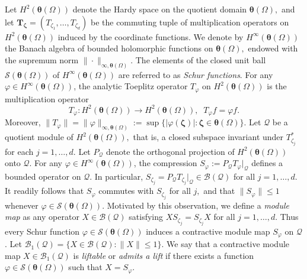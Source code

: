 \documentclass[12pt,reqno]{amsart}
\theoremstyle{remark}
\theoremstyle{definition}
\begin{document}
Let $H^2(\boldsymbol \theta(\Omega))$ denote the Hardy space on the quotient domain $\boldsymbol \theta(\Omega),$ and let $\boldsymbol T_{\boldsymbol \zeta}=(T_{\zeta_1}, \ldots, T_{\zeta_d})$ be the commuting tuple of multiplication operators on $H^2(\boldsymbol \theta(\Omega))$ induced by the coordinate functions. 
We denote by $H^\infty(\boldsymbol \theta(\Omega))$ the Banach algebra of bounded holomorphic functions on $\boldsymbol \theta(\Omega),$ endowed with the supremum norm $\|\cdot\|_{\infty, \boldsymbol \theta(\Omega)}.$ 
The elements of the closed unit ball $\mathcal{S}(\boldsymbol{\theta}(\Omega))$ of $H^\infty(\boldsymbol{\theta}(\Omega))$ are referred to as {\it Schur functions}.
For any $\varphi \in H^\infty(\boldsymbol \theta(\Omega))$, the analytic Toeplitz operator $T_{\varphi}$ on $H^2(\boldsymbol \theta(\Omega))$ is the multiplication operator $$T_{\varphi}:H^2(\boldsymbol \theta(\Omega)) \to H^2(\boldsymbol \theta(\Omega)), \;\; T_\varphi f=\varphi f.$$ Moreover, $\|T_{\varphi}\|=\|\varphi\|_{\infty, \boldsymbol \theta(\Omega)}:=\sup\{|\varphi(\boldsymbol \zeta)|: \boldsymbol \zeta\in \boldsymbol \theta(\Omega)\}.$
Let $\mathcal{Q}$ be a quotient module of $H^2(\boldsymbol \theta(\Omega)),$ that is, a closed subspace invariant under $T_{\zeta_j}^*$ for each $ j=1,\ldots,d.$ Let $P_{\mathcal{Q}}$ denote the orthogonal projection of $H^2(\boldsymbol \theta(\Omega))$ onto $\mathcal{Q}.$ For any $\varphi\in H^\infty(\boldsymbol \theta(\Omega))$, the compression $S_{\varphi}:=P_{\mathcal{Q}} T_{\varphi}|_{\mathcal{Q}}$ defines a bounded operator on $\mathcal{Q}.$ 
In particular, $S_{\zeta_j}=P_{\mathcal{Q}} T_{\zeta_j}|_{\mathcal{Q}}\in \mathcal{B}(\mathcal{Q})$ for all $j=1,\ldots,d.$ It readily follows that $S_{\varphi }$ commutes with $S_{\zeta_j}$ for all $j,$ and that $\|S_{\varphi}\| \leq 1$ whenever $\varphi \in \mathcal{S}(\boldsymbol \theta(\Omega)).$
Motivated by this observation, we define a {\it module map} as any operator $X\in \mathcal{B}(\mathcal{Q})$ satisfying $XS_{\zeta_j}=S_{\zeta_j}X$ for all $j=1,\ldots,d.$ Thus every Schur function $\varphi\in \mathcal{S}(\boldsymbol \theta(\Omega))$ induces a contractive module map $S_{\varphi}$ on $\mathcal{Q}$.
Let $\mathcal{B}_1(\mathcal{Q})=\{X \in \mathcal{B}(\mathcal{Q}): \|X\|\leq 1\}.$ We say that a contractive module map $X\in \mathcal{B}_1(\mathcal{Q})$ is {\it liftable} or {\it admits a lift} if there exists a function $\varphi \in \mathcal{S}(\boldsymbol \theta(\Omega))$ such that $X=S_\varphi.$
\end{document}
